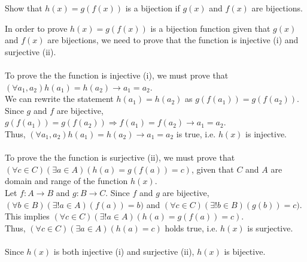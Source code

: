\documentclass[solutionorbox,answers]{exam}
\begin{document}
\begin{questions}
\question
Show that $h(x) = g(f(x))$ is a bijection if $g(x)$ and $f(x)$ are bijections.

\begin{solutionbox}{3in}
  
  In order to prove $h(x) = g(f(x))$ is a bijection function given that $g(x)$ and $f(x)$ are bijections, we need to prove that the function is injective (i) and surjective (ii).\\ 
  \\
  To prove the the function is injective (i), we must prove that $(\forall a_1, a_2) h(a_1)=h(a_2) \rightarrow a_1=a_2$.\\
  We can rewrite the statement $h(a_1)=h(a_2)$ as $g(f(a_1))=g(f(a_2))$.\\
  Since $g$ and $f$ are bijective, $g(f(a_1))=g(f(a_2)) \Rightarrow f(a_1)=f(a_2) \rightarrow a_1 = a_2$.\\
  Thus, $(\forall a_1, a_2) h(a_1)=h(a_2) \rightarrow a_1=a_2$ is true, i.e. $h(x)$ is injective.\\
  \\
  To prove the the function is surjective (ii), we must prove that $(\forall c \in C)(\exists a \in A)(h(a)=g(f(a))=c)$, given that $C$ and $A$ are domain and range of the function $h(x)$.\\
  Let $f:A \rightarrow B$ and $g:B \rightarrow C$. Since $f$ and $g$ are bijective, $(\forall b \in B)(\exists! a \in A)(f(a))=b)$ and $(\forall c \in C)(\exists! b \in B)(g(b))=c)$. 
  This implies $(\forall c \in C)(\exists! a \in A)(h(a)=g(f(a))=c)$.\\
  Thus, $(\forall c \in C)(\exists a \in A)(h(a)=c)$ holds true, i.e. $h(x)$ is surjective.\\
  \\
  Since $h(x)$ is both injective (i) and surjective (ii), $h(x)$ is bijective.
  

\end{solutionbox}
\end{questions}
\end{document}
